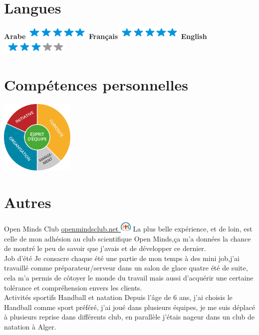 \documentclass[]{friggeri-cv}
\begin{document}
\begin{aside}
~
~
~
  \section{Langues}
    \textbf{Arabe}\includegraphics[scale=0.40]{img/5stars.png}
    \textbf{Français}\includegraphics[scale=0.40]{img/5stars.png}
    \textbf{English}\includegraphics[scale=0.40]{img/3stars.png}
    ~
    ~
  \section{Compétences personnelles}
    \includegraphics[width=100pt]{img/personnel.jpg}
    ~
\end{aside}

\section{Autres}
\begin{entrylist}
   \entry
    { }
    {Open Minds Club}
    {\href{http://www.openmindsclub.net}{openmindsclub.net \includegraphics[width=15pt]{images/favicon.png}}}
    {La plus belle expérience, et de loin, est celle de mon adhésion au club scientifique Open Minds,ça m'a données la chance de montré le peu de savoir que j'avais et de développer ce dernier.\\}
  \entry
    {}
    {Job d'été}
    {}
    {Je consacre chaque été une partie de mon temps à des mini job,j'ai travaillé comme préparateur/serveur dans un salon de glace quatre été de suite, cela m'a permis de côtoyer le monde du travail mais aussi d’acquérir une certaine tolérance et compréhension envers les clients.\\}
  \entry
    { }
    {Activités sportifs}
    {Handball et natation}
    {Depuis l'âge de 6 ans, j'ai choisis le Handball comme sport préféré, j'ai joué dans plusieurs équipes, je me suis déplacé à plusieurs reprise dans différents club, en parallèle j'étais nageur dans un club de natation à Alger.\\}
\end{entrylist}
\end{document}
